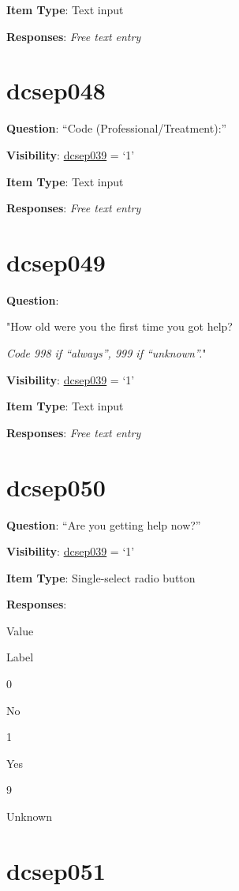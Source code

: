 \documentclass[]{book}
\begin{document}
\textbf{Item Type}: Text input

\textbf{Responses}: \emph{Free text entry}

\hypertarget{dcsep048}{%
\section{dcsep048}\label{dcsep048}}

\textbf{Question}: ``Code (Professional/Treatment):''

\textbf{Visibility}: \protect\hyperlink{dcsep039}{dcsep039} = `1'

\textbf{Item Type}: Text input

\textbf{Responses}: \emph{Free text entry}

\hypertarget{dcsep049}{%
\section{dcsep049}\label{dcsep049}}

\textbf{Question}:

"How old were you the first time you got help?

\emph{Code 998 if ``always'', 999 if ``unknown''.}"

\textbf{Visibility}: \protect\hyperlink{dcsep039}{dcsep039} = `1'

\textbf{Item Type}: Text input

\textbf{Responses}: \emph{Free text entry}

\hypertarget{dcsep050}{%
\section{dcsep050}\label{dcsep050}}

\textbf{Question}: ``Are you getting help now?''

\textbf{Visibility}: \protect\hyperlink{dcsep039}{dcsep039} = `1'

\textbf{Item Type}: Single-select radio button

\textbf{Responses}:

Value

Label

0

No

1

Yes

9

Unknown

\hypertarget{dcsep051}{%
\section{dcsep051}\label{dcsep051}}
\end{document}
